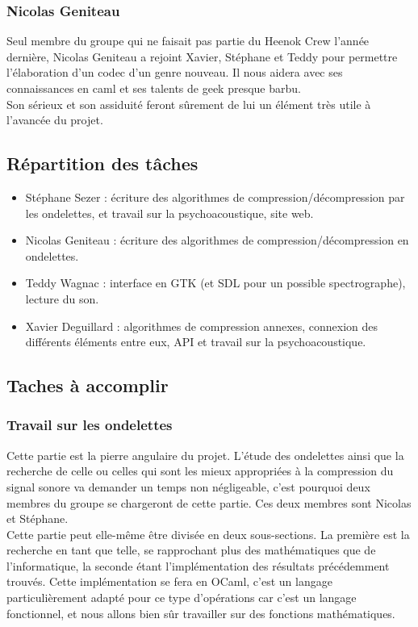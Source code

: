 \documentclass[a4paper,12pt]{article}
\begin{document}
		\subsubsection{Nicolas Geniteau}
Seul membre du  groupe qui ne faisait pas partie  du Heenok Crew l'année
dernière,  Nicolas Geniteau  a rejoint  Xavier,  Stéphane et  Teddy pour
permettre l'élaboration  d'un codec d'un genre  nouveau.  Il nous aidera
avec ses connaissances en caml et ses talents de geek presque barbu.\\
Son sérieux  et son  assiduité feront  sûrement de  lui un  élément très
utile à l'avancée du projet.

	\subsection{Répartition des tâches}
\begin{itemize}
	\item Stéphane Sezer : écriture des  algorithmes de
compression/décompression par les ondelettes, et travail sur la
psychoacoustique, site web.
	\item Nicolas Geniteau : écriture des algorithmes de
compression/décompression en ondelettes.
	\item Teddy Wagnac : interface en GTK (et SDL pour un possible
spectrographe), lecture du son.
	\item  Xavier  Deguillard  :  algorithmes  de  compression  annexes,
	connexion des différents éléments entre  eux,  API et travail sur la
	psychoacoustique.
\end{itemize}

\newpage

	\subsection{Taches à accomplir}

		\subsubsection{Travail sur les ondelettes}
Cette partie est la pierre  angulaire du projet.  L'étude des ondelettes
ainsi que la recherche de celle ou celles qui sont les mieux appropriées
à la compression du signal sonore  va demander un temps non négligeable,
c'est pourquoi  deux membres  du groupe se  chargeront de  cette partie.
Ces deux membres sont Nicolas et Stéphane.\\
Cette partie  peut  elle-même  être  divisée  en deux sous-sections.  La
première est  la recherche en  tant que telle,  se  rapprochant plus des
mathématiques que de  l'informatique,  la seconde étant l'implémentation
des résultats  précédemment  trouvés.  Cette  implémentation  se fera en
OCaml,   c'est  un   langage  particulièrement   adapté  pour   ce  type
d'opérations car c'est un langage  fonctionnel,  et nous allons bien sûr
travailler sur des fonctions mathématiques.
\end{document}
